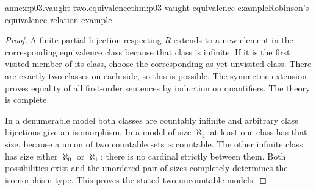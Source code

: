 \begin{annexitem}{annex:p03.vaught-two.equivalence}{thm:p03-vaught-equivalence-example}{Robinson's equivalence-relation example}
\begin{proof}
A finite partial bijection respecting \(R\) extends to a new element
in the corresponding equivalence class because that class is infinite.
If it is the first visited member of its class, choose the corresponding
as yet unvisited class. There are exactly two classes on each side, so this
is possible. The symmetric extension proves equality of all first-order
sentences by induction on quantifiers. The theory is complete.

In a denumerable model both classes are countably infinite and arbitrary
class bijections give an isomorphism. In a model of size \(\aleph_1\)
at least one class has that size, because a union of two countable sets
is countable. The other infinite class has size either \(\aleph_0\)
or \(\aleph_1\); there is no cardinal strictly between them. Both
possibilities exist and the unordered pair of sizes completely determines
the isomorphism type. This proves the stated two uncountable models.
\end{proof}
\end{annexitem}

